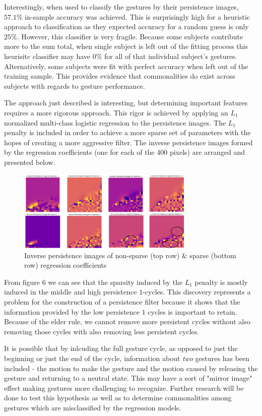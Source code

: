 \documentclass[11pt]{article}
\begin{document}
\begin{enumerate}
\begin{enumerate}
Interestingly, when used to classify the gestures by their persistence images, $57.1\%$ in-sample accuracy was achieved. This is surprisingly high for a heuristic approach to classification as they expected accuracy for a random guess is only $25\%$. However, this classifier is very fragile. Because some subjects contribute more to the sum total, when single subject is left out of the fitting process this heurisitc classifier may have $0\%$ for all of that individual subject's gestures. Alternatively, some subjects were fit with perfect accuracy when left out of the training sample. This provides evidence that commonalities do exist across subjects with regards to gesture performance.

The approach just described is interesting, but determining important features requires a more rigorous approach. This rigor is achieved by applying an $L_1$ normalized multi-class logistic regression to the persistence images. The $L_1$ penalty is included in order to achieve a more sparse set of parameters with the hopes of creating a more aggressive filter. The inverse persistence images formed by the regression coefficients (one for each of the 400 pixels) are arranged and presented below.

\begin{figure}[h]
\centering
\includegraphics[width=0.75\textwidth]{inv_persims}
\caption{Inverse persistence images of non-sparse (top row) \& sparse (bottom row) regression coefficients}
\end{figure}

From figure 6 we can see that the sparsity induced by the $L_1$ penalty is mostly induced in the middle and high persistence $1$-cycles. This discovery represents a problem for the construction of a persistence filter because it shows that the information provided by the low persistence $1$ cycles is important to retain. Because of the elder rule, we cannot remove more persistent cycles without also removing those cycles with also removing less persistent cycles.

It is possible that by inlcuding the full gesture cycle, as opposed to just the beginning or just the end of the cycle, information about \emph{two} gestures has been included - the motion to make the gesture and the motion caused by releasing the gesture and returning to a neutral state. This may have a sort of "mirror image" effect making gestures more challenging to recognize. Further research will be done to test this hypothesis as well as to determine commonalities among gestures which are misclassified by the regression models.


\end{enumerate}
\end{enumerate}
\end{document}
